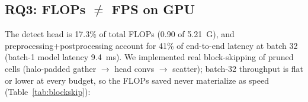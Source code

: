 \documentclass[a4paper,fleqn]{cas-dc}
\begin{document}
\subsection{RQ3: FLOPs $\neq$ FPS on GPU}
The detect head is 17.3\% of total FLOPs (0.90 of 5.21~G), and preprocessing+postprocessing account for 41\% of end-to-end latency at batch 32 (batch-1 model latency 9.4~ms). We implemented real block-skipping of pruned cells (halo-padded gather $\to$ head convs $\to$ scatter); batch-32 throughput is flat or lower at every budget, so the FLOPs saved never materialize as speed (Table~\ref{tab:blockskip}):
\begin{table}[h]\centering\footnotesize
\caption{Head-level block skipping neither accelerates inference nor preserves accuracy: halo padding inflates compute and gather/scatter overhead cancels the FLOPs savings (throughput is flat or lower at every budget, 995$\to$991/986/962/911 FPS), and even the halo-only 100\%-budget variant is 19\% slower (805 FPS). The accuracy gap to the mask-level oracle (Table~\ref{tab:budget}) reflects the head seeing pruned features that differ from the full features used to train the gate.}
\label{tab:blockskip}
\end{table}
\end{document}
